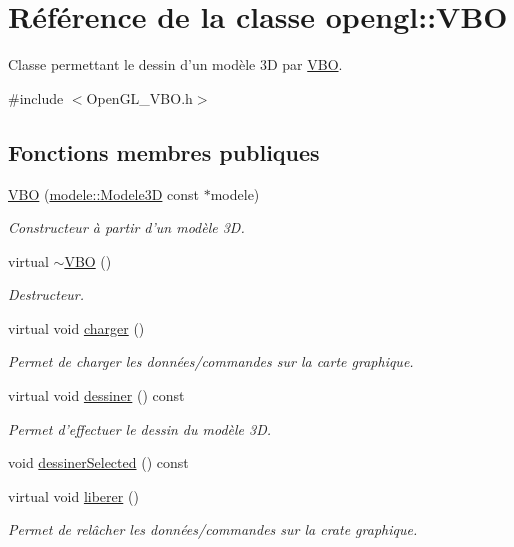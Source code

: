 \hypertarget{classopengl_1_1_v_b_o}{\section{Référence de la classe opengl\-:\-:V\-B\-O}
\label{classopengl_1_1_v_b_o}
}


Classe permettant le dessin d'un modèle 3\-D par \hyperlink{classopengl_1_1_v_b_o}{V\-B\-O}.  




{\ttfamily \#include $<$Open\-G\-L\-\_\-\-V\-B\-O.\-h$>$}

\subsection*{Fonctions membres publiques}
\begin{DoxyCompactItemize}
\item 
\hyperlink{group__modele_ga6fa9de06cf295f987e2022162f1c0d41}{V\-B\-O} (\hyperlink{classmodele_1_1_modele3_d}{modele\-::\-Modele3\-D} const $\ast$modele)
\begin{DoxyCompactList}\small\item\em Constructeur à partir d'un modèle 3\-D. \end{DoxyCompactList}\item 
virtual \hyperlink{group__modele_gafcea85cfc425d9c4720a32a53b720783}{$\sim$\-V\-B\-O} ()
\begin{DoxyCompactList}\small\item\em Destructeur. \end{DoxyCompactList}\item 
virtual void \hyperlink{group__modele_gacecd4cf0a91c2b8b34c193f7801d42ea}{charger} ()
\begin{DoxyCompactList}\small\item\em Permet de charger les données/commandes sur la carte graphique. \end{DoxyCompactList}\item 
virtual void \hyperlink{group__modele_ga41350c248ef222b9cbfb850432abbc53}{dessiner} () const 
\begin{DoxyCompactList}\small\item\em Permet d'effectuer le dessin du modèle 3\-D. \end{DoxyCompactList}\item 
void \hyperlink{group__modele_ga17f25b54d1a61772cf3a3f88a3ce6274}{dessiner\-Selected} () const 
\item 
virtual void \hyperlink{group__modele_ga6fd3c8634c2da6d9460aa5d118ac47cd}{liberer} ()
\begin{DoxyCompactList}\small\item\em Permet de relâcher les données/commandes sur la crate graphique. \end{DoxyCompactList}\end{DoxyCompactItemize}


